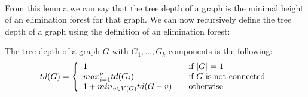 \paragraph{}
From this lemma we can say that the tree depth of a graph is the minimal height of an elimination forest for that graph. We can now recursively define the tree depth of a graph using the definition of an elimination forest:

\begin{definition}
The tree depth of a graph $G$ with $G_1, \ldots, G_k$ components is the following:
\[ td(G) = \left\{ 
  \begin{array}{l l}
    1 & \quad \text{if $\vert G\vert$ = 1}\\
    max^p_{i=1}td(G_i) & \quad \text{if $G$ is not connected}\\
    1 + min_{v \in V(G)}td(G-v) & \quad \text{otherwise}
  \end{array} \right.\]
\end{definition} 